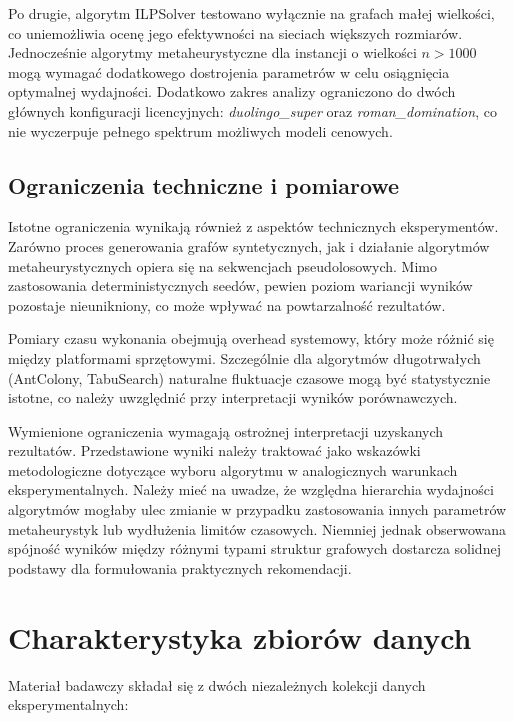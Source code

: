 Po drugie, algorytm ILPSolver testowano wyłącznie na grafach małej wielkości, co uniemożliwia ocenę jego efektywności na sieciach większych rozmiarów. Jednocześnie algorytmy metaheurystyczne dla instancji o wielkości $n > 1000$ mogą wymagać dodatkowego dostrojenia parametrów w celu osiągnięcia optymalnej wydajności. Dodatkowo zakres analizy ograniczono do dwóch głównych konfiguracji licencyjnych: \emph{duolingo\_super} oraz \emph{roman\_domination}, co nie wyczerpuje pełnego spektrum możliwych modeli cenowych.

\subsection{Ograniczenia techniczne i pomiarowe}

Istotne ograniczenia wynikają również z aspektów technicznych eksperymentów. Zarówno proces generowania grafów syntetycznych, jak i działanie algorytmów metaheurystycznych opiera się na sekwencjach pseudolosowych. Mimo zastosowania deterministycznych seedów, pewien poziom wariancji wyników pozostaje nieunikniony, co może wpływać na powtarzalność rezultatów.

Pomiary czasu wykonania obejmują overhead systemowy, który może różnić się między platformami sprzętowymi. Szczególnie dla algorytmów długotrwałych (AntColony, TabuSearch) naturalne fluktuacje czasowe mogą być statystycznie istotne, co należy uwzględnić przy interpretacji wyników porównawczych.

Wymienione ograniczenia wymagają ostrożnej interpretacji uzyskanych rezultatów. Przedstawione wyniki należy traktować jako wskazówki metodologiczne dotyczące wyboru algorytmu w analogicznych warunkach eksperymentalnych. Należy mieć na uwadze, że względna hierarchia wydajności algorytmów mogłaby ulec zmianie w przypadku zastosowania innych parametrów metaheurystyk lub wydłużenia limitów czasowych. Niemniej jednak obserwowana spójność wyników między różnymi typami struktur grafowych dostarcza solidnej podstawy dla formułowania praktycznych rekomendacji.

\section{Charakterystyka zbiorów danych}

Materiał badawczy składał się z dwóch niezależnych kolekcji danych eksperymentalnych:

